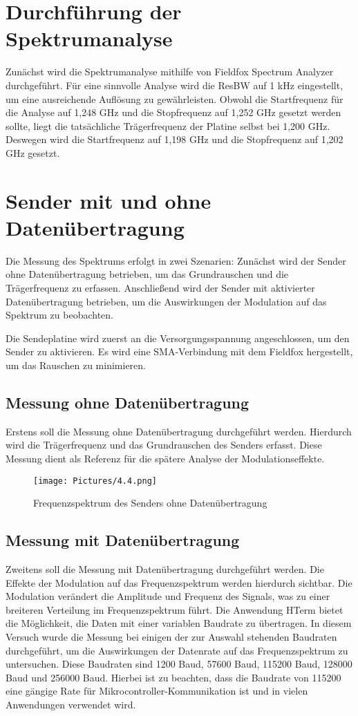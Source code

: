 \section{Durchführung der Spektrumanalyse}
Zunächst wird die Spektrumanalyse mithilfe von Fieldfox Spectrum Analyzer durchgeführt. Für eine sinnvolle Analyse wird die ResBW auf 1 kHz eingestellt, um eine ausreichende Auflösung zu gewährleisten.
Obwohl die Startfrequenz für die Analyse auf 1,248 GHz und die Stopfrequenz auf 1,252 GHz gesetzt werden sollte, liegt die tatsächliche Trägerfrequenz der Platine selbst bei 1,200 GHz. Deswegen wird die Startfrequenz auf 1,198 GHz und die Stopfrequenz auf 1,202 GHz gesetzt. 
\section{Sender mit und ohne Datenübertragung}
Die Messung des Spektrums erfolgt in zwei Szenarien: Zunächst wird der Sender ohne Datenübertragung betrieben, um das Grundrauschen und die Trägerfrequenz zu erfassen. Anschließend wird der Sender mit aktivierter Datenübertragung betrieben, um die Auswirkungen der Modulation auf das Spektrum zu beobachten.

Die Sendeplatine wird zuerst an die Versorgungsspannung angeschlossen, um den Sender zu aktivieren. Es wird eine SMA-Verbindung mit dem Fieldfox hergestellt, um das Rauschen zu minimieren. 

    \subsection{Messung ohne Datenübertragung}
    Erstens soll die Messung ohne Datenübertragung durchgeführt werden. Hierdurch wird die Trägerfrequenz und das Grundrauschen des Senders erfasst. Diese Messung dient als Referenz für die spätere Analyse der Modulationseffekte.
    \begin{figure}[H]
        \centering
        \texttt{[image: Pictures/4.4.png]}
        \caption{Frequenzspektrum des Senders ohne Datenübertragung}
        \label{fig:OhneDaten}
    \end{figure}
    \subsection{Messung mit Datenübertragung}
    Zweitens soll die Messung mit Datenübertragung durchgeführt werden. Die Effekte der Modulation auf das Frequenzspektrum werden hierdurch sichtbar. Die Modulation verändert die Amplitude und Frequenz des Signals, was zu einer breiteren Verteilung im Frequenzspektrum führt.
    Die Anwendung HTerm bietet die Möglichkeit, die Daten mit einer variablen Baudrate zu übertragen. In diesem Versuch wurde die Messung bei einigen der zur Auswahl stehenden Baudraten durchgeführt, um die Auswirkungen der Datenrate auf das Frequenzspektrum zu untersuchen. Diese Baudraten sind 1200 Baud, 57600 Baud, 115200 Baud, 128000 Baud und 256000 Baud.
    Hierbei ist zu beachten, dass die Baudrate von 115200 eine gängige Rate für Mikrocontroller-Kommunikation ist und in vielen Anwendungen verwendet wird.



